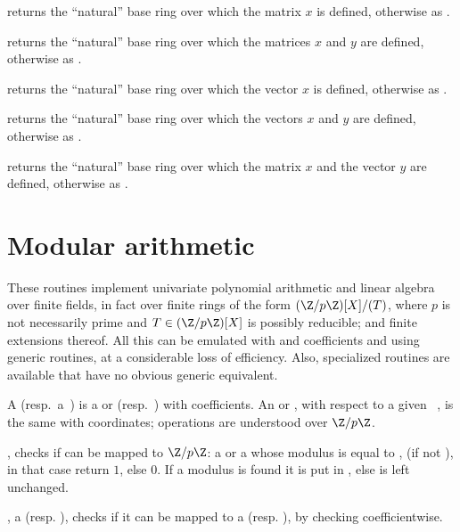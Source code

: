  returns
the ``natural'' base ring over which the matrix $x$ is defined,
otherwise as .

 returns
the ``natural'' base ring over which the matrices $x$ and $y$ are defined,
otherwise as .

 returns
the ``natural'' base ring over which the vector $x$ is defined,
otherwise as .

 returns
the ``natural'' base ring over which the vectors $x$ and $y$ are defined,
otherwise as .

returns the ``natural'' base ring over which the matrix $x$ and the vector
$y$ are defined, otherwise as .

\section{Modular arithmetic}

\noindent These routines implement univariate polynomial arithmetic and
linear algebra over finite fields, in fact over finite rings of the form
$(\Z/p\Z)[X]/(T)$, where $p$ is not necessarily prime and $T\in(\Z/p\Z)[X]$ is
possibly reducible; and finite extensions thereof. All this can be emulated
with  and  coefficients and using generic routines,
at a considerable loss of efficiency. Also, specialized routines are
available that have no obvious generic equivalent.

 A 
(resp.~a~) is a  or  (resp.~) with
 coefficients. An  or , with respect to a given
~, is the same with  coordinates; operations are
understood over $\Z/p\Z$.


, checks if  can be mapped to
$\Z/p\Z$: a  or a  whose modulus is equal to ,
(if  not ), in that case return $1$, else $0$. If a modulus
is found it is put in , else  is left unchanged.

,  a  (resp. ),
checks if it can be mapped to a  (resp. ), by checking
 coefficientwise.

